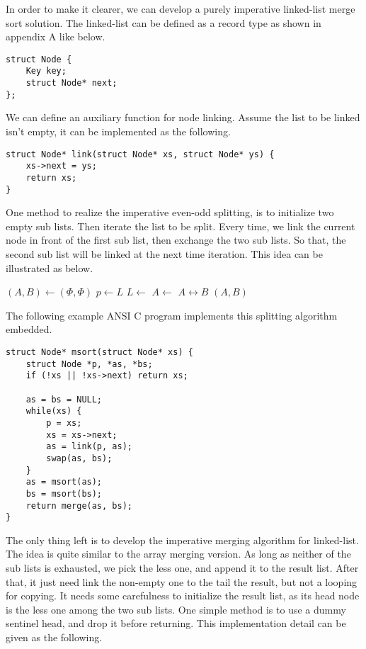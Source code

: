 \documentclass[UTF8]{article}
\begin{document}
In order to make it clearer, we can develop a purely imperative linked-list merge sort solution.
The linked-list can be defined as a record type as shown in appendix A like below.

\lstset{language=C}
\begin{lstlisting}
struct Node {
    Key key;
    struct Node* next;
};
\end{lstlisting}

We can define an auxiliary function for node linking. Assume the list to be linked isn't empty, it
can be implemented as the following.

\lstset{language=C}
\begin{lstlisting}
struct Node* link(struct Node* xs, struct Node* ys) {
    xs->next = ys;
    return xs;
}
\end{lstlisting}

One method to realize the imperative even-odd splitting, is to initialize two empty sub lists.
Then iterate the list to be split. Every time, we link the current node in front of the
first sub list, then exchange the two sub lists. So that, the second sub list will be linked
at the next time iteration. This idea can be illustrated as below.

\begin{algorithmic}[1]
  \State $(A, B) \gets (\Phi, \Phi)$
    \State $p \gets L$
    \State $L \gets $ 
    \State $A \gets $ 
    \State {} $A \leftrightarrow B$
  \EndWhile
  \State \Return $(A, B)$
\EndFunction
\end{algorithmic}

The following example ANSI C program implements this splitting algorithm embedded.

\lstset{language=C}
\begin{lstlisting}
struct Node* msort(struct Node* xs) {
    struct Node *p, *as, *bs;
    if (!xs || !xs->next) return xs;

    as = bs = NULL;
    while(xs) {
        p = xs;
        xs = xs->next;
        as = link(p, as);
        swap(as, bs);
    }
    as = msort(as);
    bs = msort(bs);
    return merge(as, bs);
}
\end{lstlisting}

The only thing left is to develop the imperative merging algorithm for linked-list. The idea
is quite similar to the array merging version. As long as neither of the sub lists is exhausted,
we pick the less one, and append it to the result list. After that, it just need link the
non-empty one to the tail the result, but not a looping for copying. It needs some carefulness
to initialize the result list, as its head node is the less one among the two sub lists.
One simple method is to use a dummy sentinel head, and drop it before returning. This implementation
detail can be given as the following.
\end{document}
